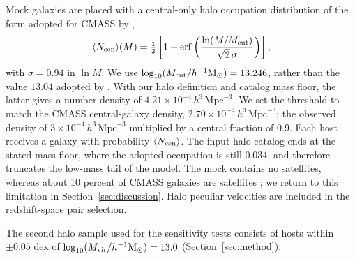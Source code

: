 Mock galaxies are placed with a central-only halo occupation distribution of
the form adopted for CMASS by \citet{White2011},
\begin{equation}
  \langle N_{\rm cen}\rangle(M) = \tfrac{1}{2}\left[1+\mathrm{erf}
  \left(\frac{\ln(M/M_{\rm cut})}{\sqrt{2}\,\sigma}\right)\right],
  \label{eq:hod}
\end{equation}
with $\sigma=0.94$ in $\ln M$. We use
$\log_{10}(M_{\rm cut}/h^{-1}\mathrm{M}_{\odot})=13.246$, rather than the
value $13.04$ adopted by \citet{White2011}. With our halo definition and
catalog mass floor, the latter gives a number density of
$4.21\times10^{-4}\,h^{3}\,\mathrm{Mpc}^{-3}$. We set the threshold to match
the CMASS central-galaxy density,
$2.70\times10^{-4}\,h^{3}\,\mathrm{Mpc}^{-3}$: the observed density of
$3\times10^{-4}\,h^{3}\,\mathrm{Mpc}^{-3}$ multiplied by a central fraction
of 0.9.
Each host receives a galaxy with probability $\langle N_{\rm cen}\rangle$.
The input halo catalog ends at the stated mass floor, where the adopted
occupation is still $0.034$, and therefore truncates the low-mass tail of
the model. The mock contains no satellites, whereas about 10 percent of
CMASS galaxies are satellites \citep{White2011}; we return to this limitation
in Section~\ref{sec:discussion}. Halo peculiar velocities are included in
the redshift-space pair selection.

The second halo sample used for the sensitivity tests consists of hosts
within $\pm0.05$ dex of
$\log_{10}(M_{\rm vir}/h^{-1}\mathrm{M}_{\odot})=13.0$
(Section~\ref{sec:method}).

